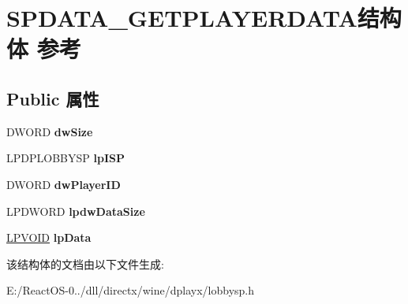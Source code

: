 \hypertarget{struct_s_p_d_a_t_a___g_e_t_p_l_a_y_e_r_d_a_t_a}{}\section{S\+P\+D\+A\+T\+A\+\_\+\+G\+E\+T\+P\+L\+A\+Y\+E\+R\+D\+A\+T\+A结构体 参考}
\label{struct_s_p_d_a_t_a___g_e_t_p_l_a_y_e_r_d_a_t_a}
\subsection*{Public 属性}
\begin{DoxyCompactItemize}
\item 
\mbox{\label{struct_s_p_d_a_t_a___g_e_t_p_l_a_y_e_r_d_a_t_a_ad31af321e043bd15a5aee5d22f47b544}} 
D\+W\+O\+RD {\bfseries dw\+Size}
\item 
\mbox{\label{struct_s_p_d_a_t_a___g_e_t_p_l_a_y_e_r_d_a_t_a_af9c92b074766dbcf72e1abaca9c6a15b}} 
L\+P\+D\+P\+L\+O\+B\+B\+Y\+SP {\bfseries lp\+I\+SP}
\item 
\mbox{\label{struct_s_p_d_a_t_a___g_e_t_p_l_a_y_e_r_d_a_t_a_a7b33eb45ecf4544b4a0dda323afec643}} 
D\+W\+O\+RD {\bfseries dw\+Player\+ID}
\item 
\mbox{\label{struct_s_p_d_a_t_a___g_e_t_p_l_a_y_e_r_d_a_t_a_aea15176de8a89ef17da4b7d032f4cbe5}} 
L\+P\+D\+W\+O\+RD {\bfseries lpdw\+Data\+Size}
\item 
\mbox{\label{struct_s_p_d_a_t_a___g_e_t_p_l_a_y_e_r_d_a_t_a_ac17fc9fdc611b505e219ffd649e027b3}} 
\hyperlink{interfacevoid}{L\+P\+V\+O\+ID} {\bfseries lp\+Data}
\end{DoxyCompactItemize}


该结构体的文档由以下文件生成\+:\begin{DoxyCompactItemize}
\item 
E\+:/\+React\+O\+S-\/0../dll/directx/wine/dplayx/lobbysp.\+h\end{DoxyCompactItemize}
